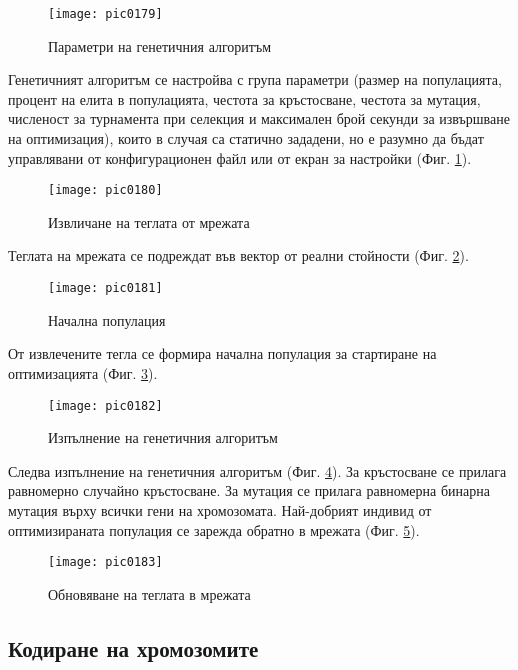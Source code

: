 \begin{figure}[h]
  \centering
  \texttt{[image: pic0179]}
  \caption{Параметри на генетичния алгоритъм}
\label{fig:pic0179}
\end{figure}
\FloatBarrier

Генетичният алгоритъм се настройва с група параметри (размер на популацията, процент на елита в популацията, честота за кръстосване, честота за мутация, численост за турнамента при селекция и максимален брой секунди за извършване на оптимизация), които в случая са статично зададени, но е разумно да бъдат управлявани от конфигурационен файл или от екран за настройки (Фиг. \ref{fig:pic0179}). 

\begin{figure}[h]
  \centering
  \texttt{[image: pic0180]}
  \caption{Извличане на теглата от мрежата}
\label{fig:pic0180}
\end{figure}
\FloatBarrier

Теглата на мрежата се подреждат във вектор от реални стойности (Фиг. \ref{fig:pic0180}).

\begin{figure}[h]
  \centering
  \texttt{[image: pic0181]}
  \caption{Начална популация}
\label{fig:pic0181}
\end{figure}
\FloatBarrier

От извлечените тегла се формира начална популация за стартиране на оптимизацията (Фиг. \ref{fig:pic0181}).

\begin{figure}[h]
  \centering
  \texttt{[image: pic0182]}
  \caption{Изпълнение на генетичния алгоритъм}
\label{fig:pic0182}
\end{figure}
\FloatBarrier

Следва изпълнение на генетичния алгоритъм (Фиг. \ref{fig:pic0182}). За кръстосване се прилага равномерно случайно кръстосване. За мутация се прилага равномерна бинарна мутация върху всички гени на хромозомата. Най-добрият индивид от оптимизираната популация се зарежда обратно в мрежата (Фиг. \ref{fig:pic0183}). 

\begin{figure}[h]
  \centering
  \texttt{[image: pic0183]}
  \caption{Обновяване на теглата в мрежата}
\label{fig:pic0183}
\end{figure}
\FloatBarrier

\subsection{Кодиране на хромозомите}


